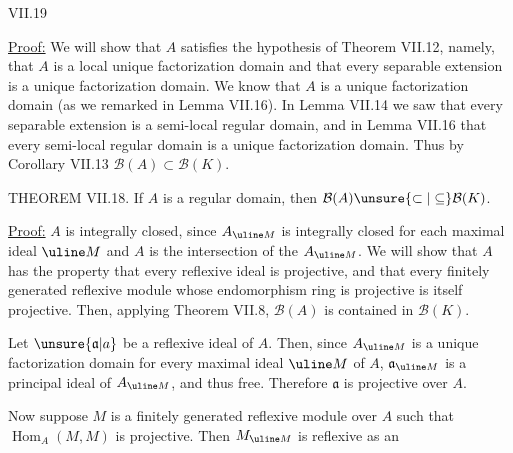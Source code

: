 
VII.19

\uline{Proof:} We will show that $A$ satisfies the hypothesis of
Theorem VII.12, namely, that $A$ is a local unique factorization
domain and that every separable extension is a unique factorization
domain. We know that $A$ is a unique factorization domain (as we
remarked in Lemma VII.16). In Lemma VII.14 we saw that every
separable extension is a semi-local regular domain, and in Lemma
VII.16 that every semi-local regular domain is a unique factorization
domain. Thus by Corollary VII.13 $\mathcal B(A)\subset\mathcal B(K)$.

THEOREM VII.18. If $A$ is a regular domain, then
$\mathcal B(A)\unsure{\subset|\subseteq}\mathcal B(K)$.

\uline{Proof:} $A$ is integrally closed, since $A_{\uline M}$ is integrally closed
for each maximal ideal $\uline M$ and $A$ is the intersection of the $A_{\uline M}$.
We will show that $A$ has the property that every reflexive ideal is
projective, and that every finitely generated reflexive module whose
endomorphism ring is projective is itself projective. Then, applying
Theorem VII.8, $\mathcal B(A)$ is contained in $\mathcal B(K)$.

Let $\unsure{\mathfrak a|a}$ be a reflexive ideal of $A$. Then, since $A_{\uline M}$ is a unique
factorization domain for every maximal ideal $\uline M$ of $A$, $\mathfrak a_{\uline M}$ is a
principal ideal of $A_{\uline M}$, and thus free. Therefore $\mathfrak a$ is projective
over $A$.

Now suppose $M$ is a finitely generated reflexive module over $A$
such that $\operatorname{Hom}_A(M,M)$ is projective. Then $M_{\uline M}$ is reflexive as an
